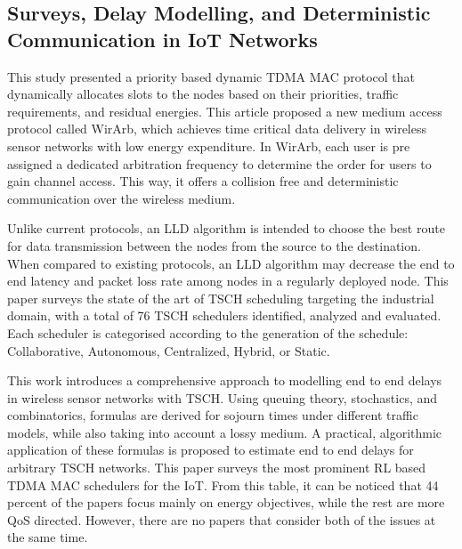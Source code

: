 \documentclass[a4paper,fleqn]{cas-dc}
\numberwithin{equation}{section}
\begin{document}
\subsection{Surveys, Delay Modelling, and Deterministic Communication in IoT Networks}

This study presented a priority based dynamic TDMA MAC protocol\cite{gul2025priority} that dynamically allocates slots to the nodes based on their priorities, traffic requirements, and residual energies. This article proposed a new medium access protocol called WirArb,\cite{zheng2015wirarb} which achieves time critical data delivery in wireless sensor networks with low energy expenditure. In WirArb, each user is pre assigned a dedicated arbitration frequency to determine the order for users to gain channel access. This way, it offers a collision free and deterministic communication over the wireless medium.

Unlike current protocols\cite{hai2022design}, an LLD algorithm is intended to choose the best route for data transmission between the nodes from the source to the destination. When compared to existing protocols, an LLD algorithm may decrease the end to end latency and packet loss rate among nodes in a regularly deployed node. This paper surveys the state of the art of TSCH scheduling\cite{urke2021survey} targeting the industrial domain, with a total of 76 TSCH schedulers identified, analyzed and evaluated. Each scheduler is categorised according to the generation of the schedule: Collaborative, Autonomous, Centralized, Hybrid, or Static.

This work introduces a comprehensive approach to modelling end to end delays in wireless sensor networks with TSCH. Using queuing theory,\cite{shudrenko2024modeling} stochastics, and combinatorics, formulas are derived for sojourn times under different traffic models, while also taking into account a lossy medium. A practical, algorithmic application of these formulas is proposed to estimate end to end delays for arbitrary TSCH networks. This paper surveys the most prominent RL based TDMA MAC schedulers\cite{carie2023directional} for the IoT. From this table,\cite{kherbache2022reinforcement} it can be noticed that 44 percent of the papers focus mainly on energy objectives, while the rest are more QoS directed. However, there are no papers that consider both of the issues at the same time. 
\end{document}
